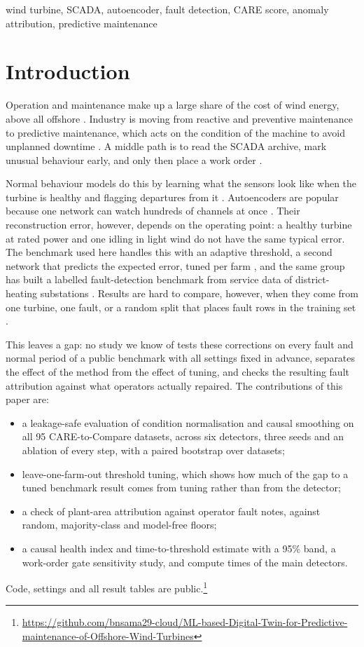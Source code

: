 \documentclass[conference]{IEEEtran}
\begin{document}
\begin{IEEEkeywords}
wind turbine, SCADA, autoencoder, fault detection, CARE score, anomaly attribution, predictive maintenance
\end{IEEEkeywords}

\section{Introduction}
Operation and maintenance make up a large share of the cost of wind energy, above all offshore \cite{r20}. Industry is moving from reactive and preventive maintenance to predictive maintenance, which acts on the condition of the machine to avoid unplanned downtime \cite{r5,r8}. A middle path is to read the SCADA archive, mark unusual behaviour early, and only then place a work order \cite{r20}.

Normal behaviour models do this by learning what the sensors look like when the turbine is healthy and flagging departures from it \cite{r21,r22,r23}. Autoencoders are popular because one network can watch hundreds of channels at once \cite{r10,r11,r25}. Their reconstruction error, however, depends on the operating point: a healthy turbine at rated power and one idling in light wind do not have the same typical error. The benchmark used here handles this with an adaptive threshold, a second network that predicts the expected error, tuned per farm \cite{r12}, and the same group has built a labelled fault-detection benchmark from service data of district-heating substations \cite{r19}. Results are hard to compare, however, when they come from one turbine, one fault, or a random split that places fault rows in the training set \cite{r12,r28}.

This leaves a gap: no study we know of tests these corrections on every fault and normal period of a public benchmark with all settings fixed in advance, separates the effect of the method from the effect of tuning, and checks the resulting fault attribution against what operators actually repaired. The contributions of this paper are:
\begin{itemize}
\item a leakage-safe evaluation of condition normalisation and causal smoothing on all 95 CARE-to-Compare datasets, across six detectors, three seeds and an ablation of every step, with a paired bootstrap over datasets;
\item leave-one-farm-out threshold tuning, which shows how much of the gap to a tuned benchmark result comes from tuning rather than from the detector;
\item a check of plant-area attribution against operator fault notes, against random, majority-class and model-free floors;
\item a causal health index and time-to-threshold estimate with a 95\% band, a work-order gate sensitivity study, and compute times of the main detectors.
\end{itemize}
Code, settings and all result tables are public.\footnote{\url{https://github.com/bnsama29-cloud/ML-based-Digital-Twin-for-Predictive-maintenance-of-Offshore-Wind-Turbines}}
\end{document}
